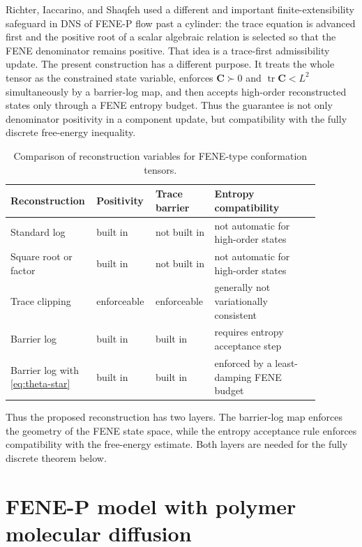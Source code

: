 ﻿\documentclass[11pt]{amsart}
\newcommand{\CC}{\bm C}
\newcommand{\tr}{\operatorname{tr}}
\begin{document}
Richter, Iaccarino, and Shaqfeh \cite{RichterIaccarinoShaqfeh2010} used a different and important finite-extensibility safeguard in DNS of FENE-P flow past a cylinder: the trace equation is advanced first and the positive root of a scalar algebraic relation is selected so that the FENE denominator remains positive.  That idea is a trace-first admissibility update.  The present construction has a different purpose.  It treats the whole tensor as the constrained state variable, enforces $\CC\succ0$ and $\tr\CC<L^2$ simultaneously by a barrier-log map, and then accepts high-order reconstructed states only through a FENE entropy budget.  Thus the guarantee is not only denominator positivity in a component update, but compatibility with the fully discrete free-energy inequality.

\begin{table}[htbp]
\centering
\caption{Comparison of reconstruction variables for FENE-type conformation tensors.}
\label{tab:reconstruction-comparison}
\small
\setlength{\tabcolsep}{3pt}
\begin{tabular}{p{0.19\linewidth}p{0.18\linewidth}p{0.18\linewidth}p{0.33\linewidth}}
\toprule
Reconstruction & Positivity & Trace barrier & Entropy compatibility \\
\midrule
Standard log & built in & not built in & not automatic for high-order states \\
Square root or factor & built in & not built in & not automatic for high-order states \\
Trace clipping & enforceable & enforceable & generally not variationally consistent \\
Barrier log & built in & built in & requires entropy acceptance step \\
Barrier log with \eqref{eq:theta-star} & built in & built in & enforced by a least-damping FENE budget \\
\bottomrule
\end{tabular}
\end{table}

Thus the proposed reconstruction has two layers.  The barrier-log map enforces the geometry of the FENE state space, while the entropy acceptance rule enforces compatibility with the free-energy estimate.  Both layers are needed for the fully discrete theorem below.

\section{FENE-P model with polymer molecular diffusion}
\end{document}

